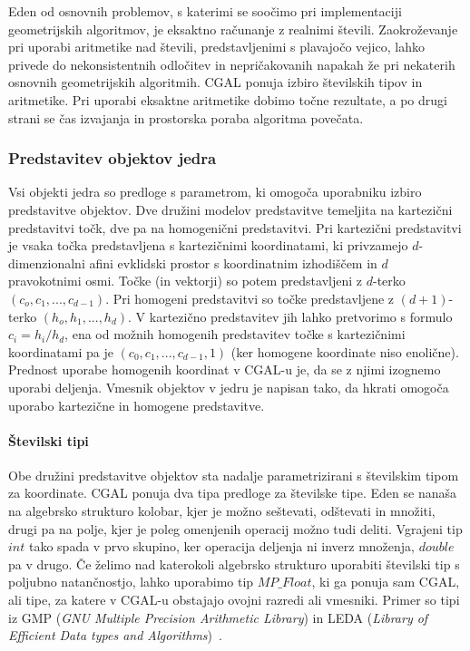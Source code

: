 \documentclass[a4paper, 12pt]{book}
\newcommand{\U}{\texttt{\_}}
\begin{document}
Eden od osnovnih problemov, s katerimi se soočimo pri implementaciji geometrijskih algoritmov, je eksaktno računanje z realnimi števili. Zaokroževanje pri uporabi aritmetike nad števili, predstavljenimi s plavajočo vejico, lahko privede do nekonsistentnih odločitev in nepričakovanih napakah že pri nekaterih osnovnih geometrijskih algoritmih. CGAL ponuja izbiro številskih tipov in aritmetike. Pri uporabi eksaktne aritmetike dobimo točne rezultate, a po drugi strani se čas izvajanja in prostorska poraba algoritma povečata.

\subsubsection{Predstavitev objektov jedra}
Vsi objekti jedra so predloge s parametrom, ki omogoča uporabniku izbiro predstavitve objektov. Dve družini modelov predstavitve temeljita na kartezični predstavitvi točk, dve pa na homogenični predstavitvi. Pri kartezični predstavitvi je vsaka točka predstavljena s kartezičnimi koordinatami, ki privzamejo $d$-dimenzionalni afini evklidski prostor s koordinatnim izhodiščem in $d$ pravokotnimi osmi. Točke (in vektorji) so potem predstavljeni z $d$-terko $(c_o, c_1,..., c_{d-1})$. Pri homogeni predstavitvi so točke predstavljene z $(d+1)$-terko $(h_o, h_1,...,h_d)$. V kartezično predstavitev jih lahko pretvorimo s formulo $c_i = h_i/h_d$, ena od možnih homogenih predstavitev točke s kartezičnimi koordinatami pa je $(c_0, c_1,..., c_{d-1}, 1)$ (ker homogene koordinate niso enolične). Prednost uporabe homogenih koordinat v CGAL-u je, da se z njimi izognemo uporabi deljenja. Vmesnik objektov v jedru je napisan tako, da hkrati omogoča uporabo kartezične in homogene predstavitve. 

\paragraph*{Številski tipi}
Obe družini predstavitve objektov sta nadalje parametrizirani s številskim tipom za koordinate. CGAL ponuja dva tipa predloge za številske tipe. Eden se nanaša na algebrsko strukturo kolobar, kjer je možno seštevati, odštevati in množiti, drugi pa na polje, kjer je poleg omenjenih operacij možno tudi deliti. Vgrajeni tip $int$ tako spada v prvo skupino, ker operacija deljenja ni inverz množenja, $double$ pa v drugo. Če želimo nad katerokoli algebrsko strukturo uporabiti številski tip s poljubno natančnostjo, lahko uporabimo tip $MP\U Float$, ki ga ponuja sam CGAL, ali tipe, za  katere v CGAL-u obstajajo ovojni razredi ali vmesniki. Primer so tipi iz GMP (\textit{GNU Multiple Precision Arithmetic Library}) in LEDA (\textit{Library of Efficient Data types and Algorithms})~\cite{cgal:hhkps-nt-16b}.
\end{document}
